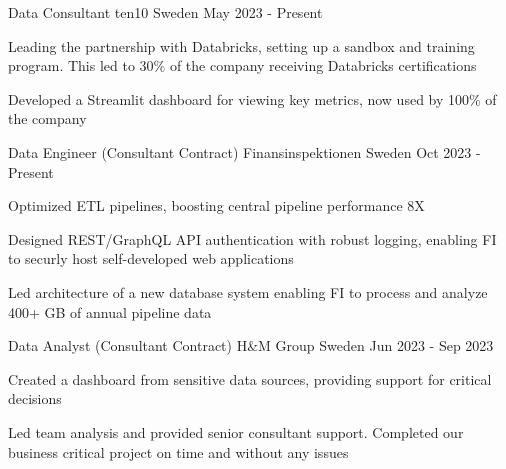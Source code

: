 

\begin{cventries}

  \cventry
    {Data Consultant} %
    {ten10} %
    {Sweden} %
    {May 2023 - Present} %
    {
      \begin{cvitems} %
        \item {Leading the partnership with Databricks, setting up a sandbox and training program. This led to 30\% of the company receiving Databricks certifications}
        \item {Developed a Streamlit dashboard for viewing key metrics, now used by 100\% of the company}
      \end{cvitems}
    }

  \cventry
    {Data Engineer (Consultant Contract)} %
    {Finansinspektionen} %
    {Sweden} %
    {Oct 2023 - Present} %
    {
      \begin{cvitems} %
        \item {Optimized ETL pipelines, boosting central pipeline performance 8X}
        \item {Designed REST/GraphQL API authentication with robust logging, enabling FI to securly host self-developed web applications}
        \item {Led architecture of a new database system enabling FI to process and analyze 400+ GB of annual pipeline data}
      \end{cvitems}
    }

  \cventry
    {Data Analyst (Consultant Contract)} %
    {H\&M Group} %
    {Sweden} %
    {Jun 2023 - Sep 2023} %
    {
      \begin{cvitems} %
        \item {Created a dashboard from sensitive data sources, providing support for critical decisions}
        \item {Led team analysis and provided senior consultant support. Completed our business critical project on time and without any issues}
      \end{cvitems}
    }


\end{cventries}
